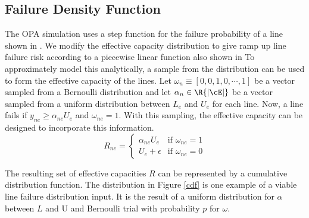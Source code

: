 \subsection*{Failure Density Function}
The OPA simulation uses a step function for the failure probability of a line shown in .  We modify the effective capacity distribution to give ramp up line failure risk according to a piecewise linear function also shown in    To approximately model this analytically, a sample from the distribution can be used to form the effective capacity of the lines.  Let $\omega_n \equiv\left[ 0, 0, 1, 0, \cdots, 1\right]$  be a vector sampled from a Bernoulli distribution and let $\alpha_n \in \R{|\cE|}$ be a vector sampled from a uniform distribution between $L_e$ and $U_e$ for each line.  Now, a line fails if $y_{ne} \ge \alpha_{ne} U_e$ and $\omega_{ne} =1$.  With this sampling, the effective capacity can be designed to incorporate this information.    
\begin{equation}
 R_{ne} = 
 \left\{ 
	\begin{array}{lr}
				\alpha_{ne} U_e & \mbox{if } \omega_{ne}=1\\
			  U_e + \epsilon & \mbox{if } \omega_{ne}=0
	\end{array}
 \right. \label{r}
\end{equation}

The resulting set of effective capacities $R$ can be represented by a cumulative distribution function. The distribution in Figure \ref{cdf} is one example of a viable line failure distribution input.  It is the result of a uniform distribution for $\alpha$ between $L$ and U and Bernoulli trial with probability $p$ for $\omega$.  


